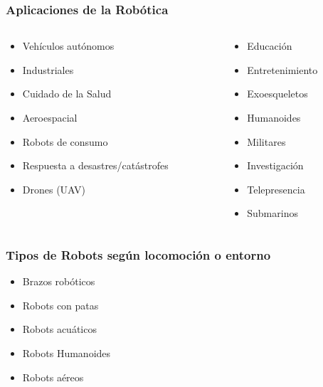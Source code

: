 \begin{frame}
    \frametitle{Aplicaciones de la Robótica}

    \begin{columns}[T] %
        \begin{column}{.48\textwidth}
            \begin{itemize}
                \item Vehículos autónomos
                \item Industriales
                \item Cuidado de la Salud
                \item Aeroespacial
                \item Robots de consumo
                \item Respuesta a desastres/catástrofes
                \item Drones (UAV)
            \end{itemize}
        \end{column}%
        \hfill%
        \begin{column}{.48\textwidth}
            \begin{itemize}
                \item Educación
                \item Entretenimiento
                \item Exoesqueletos
                \item Humanoides
                \item Militares
                \item Investigación
                \item Telepresencia
                \item Submarinos
            \end{itemize}
        \end{column}%
    \end{columns}


\end{frame}

\begin{frame}
    \frametitle{Tipos de Robots según locomoción o entorno}

    \begin{itemize}
        \item Brazos robóticos
        \item Robots con patas
        \item Robots acuáticos
        \item Robots Humanoides
        \item Robots aéreos
    \end{itemize}

\end{frame}


